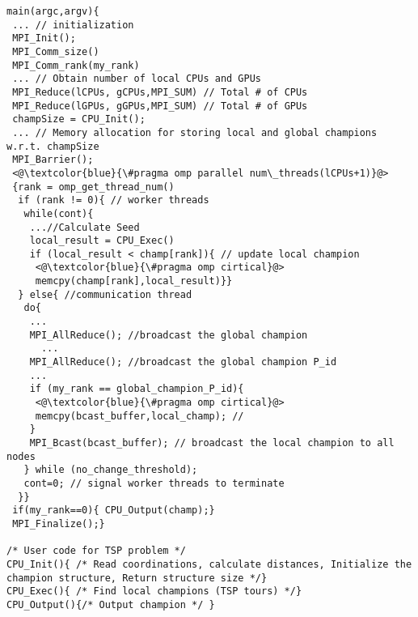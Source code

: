 
\begin{frame}{}
  \lstset{language=C}
 \begin{lstlisting}[caption={My Caption}]
main(argc,argv){
 ... // initialization
 MPI_Init();
 MPI_Comm_size()
 MPI_Comm_rank(my_rank)
 ... // Obtain number of local CPUs and GPUs
 MPI_Reduce(lCPUs, gCPUs,MPI_SUM) // Total # of CPUs
 MPI_Reduce(lGPUs, gGPUs,MPI_SUM) // Total # of GPUs
 champSize = CPU_Init();
 ... // Memory allocation for storing local and global champions w.r.t. champSize
 MPI_Barrier();
 <@\textcolor{blue}{\#pragma omp parallel num\_threads(lCPUs+1)}@>
 {rank = omp_get_thread_num()
  if (rank != 0){ // worker threads
   while(cont){
    ...//Calculate Seed
    local_result = CPU_Exec()
    if (local_result < champ[rank]){ // update local champion
     <@\textcolor{blue}{\#pragma omp cirtical}@>
     memcpy(champ[rank],local_result)}}
  } else{ //communication thread
   do{
    ...
    MPI_AllReduce(); //broadcast the global champion 
	  ...
    MPI_AllReduce(); //broadcast the global champion P_id
    ...
    if (my_rank == global_champion_P_id){
     <@\textcolor{blue}{\#pragma omp cirtical}@>
     memcpy(bcast_buffer,local_champ); // 
    }
    MPI_Bcast(bcast_buffer); // broadcast the local champion to all nodes
   } while (no_change_threshold);
   cont=0; // signal worker threads to terminate
  }}
 if(my_rank==0){ CPU_Output(champ);}
 MPI_Finalize();}

/* User code for TSP problem */
CPU_Init(){ /* Read coordinations, calculate distances, Initialize the champion structure, Return structure size */}
CPU_Exec(){ /* Find local champions (TSP tours) */}
CPU_Output(){/* Output champion */ }


\end{lstlisting}
\end{frame}

